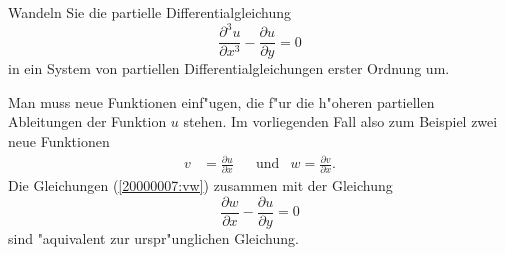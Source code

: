Wandeln Sie die partielle Differentialgleichung
\[
\frac{\partial^3 u}{\partial x^3}-\frac{\partial u}{\partial y}=0
\]
in ein System von partiellen Differentialgleichungen erster Ordnung um.

\begin{loesung}
Man muss neue Funktionen einf"ugen, die f"ur die h"oheren partiellen
Ableitungen der Funktion $u$ stehen. Im vorliegenden Fall also zum
Beispiel zwei neue Funktionen
\begin{align}
v&=\frac{\partial u}{\partial x}
&
&\text{und}&
w=\frac{\partial v}{\partial x}.
\label{20000007:vw}
\end{align}
Die Gleichungen (\ref{20000007:vw}) zusammen mit der Gleichung
\[
\frac{\partial w}{\partial x}-\frac{\partial u}{\partial y}=0
\]
sind "aquivalent zur urspr"unglichen Gleichung.
\end{loesung}
